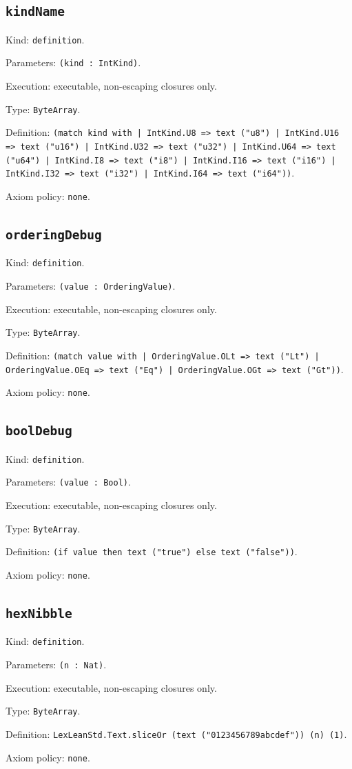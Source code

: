 \documentclass[11pt]{article}
\begin{document}
\subsection*{\texttt{kindName}}
\noindent Kind: \texttt{definition}.\par
\noindent Parameters: \texttt{(kind : IntKind)}.\par
\noindent Execution: executable, non-escaping closures only.\par
\noindent Type: \texttt{ByteArray}.\par
\noindent Definition: \texttt{(match kind with | IntKind.U8 => text ("u8") | IntKind.U16 => text ("u16") | IntKind.U32 => text ("u32") | IntKind.U64 => text ("u64") | IntKind.I8 => text ("i8") | IntKind.I16 => text ("i16") | IntKind.I32 => text ("i32") | IntKind.I64 => text ("i64"))}.\par
\noindent Axiom policy: \texttt{none}.\par
\subsection*{\texttt{orderingDebug}}
\noindent Kind: \texttt{definition}.\par
\noindent Parameters: \texttt{(value : OrderingValue)}.\par
\noindent Execution: executable, non-escaping closures only.\par
\noindent Type: \texttt{ByteArray}.\par
\noindent Definition: \texttt{(match value with | OrderingValue.OLt => text ("Lt") | OrderingValue.OEq => text ("Eq") | OrderingValue.OGt => text ("Gt"))}.\par
\noindent Axiom policy: \texttt{none}.\par
\subsection*{\texttt{boolDebug}}
\noindent Kind: \texttt{definition}.\par
\noindent Parameters: \texttt{(value : Bool)}.\par
\noindent Execution: executable, non-escaping closures only.\par
\noindent Type: \texttt{ByteArray}.\par
\noindent Definition: \texttt{(if value then text ("true") else text ("false"))}.\par
\noindent Axiom policy: \texttt{none}.\par
\subsection*{\texttt{hexNibble}}
\noindent Kind: \texttt{definition}.\par
\noindent Parameters: \texttt{(n : Nat)}.\par
\noindent Execution: executable, non-escaping closures only.\par
\noindent Type: \texttt{ByteArray}.\par
\noindent Definition: \texttt{LexLeanStd.Text.sliceOr (text ("0123456789abcdef")) (n) (1)}.\par
\noindent Axiom policy: \texttt{none}.\par
\end{document}
